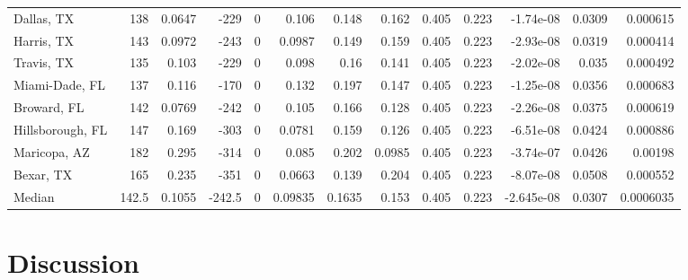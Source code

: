 \documentclass[12pt,letterpaper]{article}
\begin{document}
\begin{sidewaystable}
{\begin{tabular}{lrrrrrrrrrrrr}
 Dallas, TX        & 138   &  0.0647 & -229   &     0 &         0.106   &           0.148  &         0.162  &        0.405 &        0.223 &       -1.74e-08  &           0.0309  &       0.000615  \\
 Harris, TX        & 143   &  0.0972 & -243   &     0 &         0.0987  &           0.149  &         0.159  &        0.405 &        0.223 &       -2.93e-08  &           0.0319  &       0.000414  \\
 Travis, TX        & 135   &  0.103  & -229   &     0 &         0.098   &           0.16   &         0.141  &        0.405 &        0.223 &       -2.02e-08  &           0.035   &       0.000492  \\
 Miami-Dade, FL    & 137   &  0.116  & -170   &     0 &         0.132   &           0.197  &         0.147  &        0.405 &        0.223 &       -1.25e-08  &           0.0356  &       0.000683  \\
 Broward, FL       & 142   &  0.0769 & -242   &     0 &         0.105   &           0.166  &         0.128  &        0.405 &        0.223 &       -2.26e-08  &           0.0375  &       0.000619  \\
 Hillsborough, FL  & 147   &  0.169  & -303   &     0 &         0.0781  &           0.159  &         0.126  &        0.405 &        0.223 &       -6.51e-08  &           0.0424  &       0.000886  \\
 Maricopa, AZ      & 182   &  0.295  & -314   &     0 &         0.085   &           0.202  &         0.0985 &        0.405 &        0.223 &       -3.74e-07  &           0.0426  &       0.00198   \\
 Bexar, TX         & 165   &  0.235  & -351   &     0 &         0.0663  &           0.139  &         0.204  &        0.405 &        0.223 &       -8.07e-08  &           0.0508  &       0.000552  \\
\hline
 Median            & 142.5 &  0.1055 & -242.5 &     0 &         0.09835 &           0.1635 &         0.153  &        0.405 &        0.223 &       -2.645e-08 &           0.0307  &       0.0006035 \\
\hline
\end{tabular}


}\end{sidewaystable}

\clearpage
\section*{Discussion}
\end{document}
